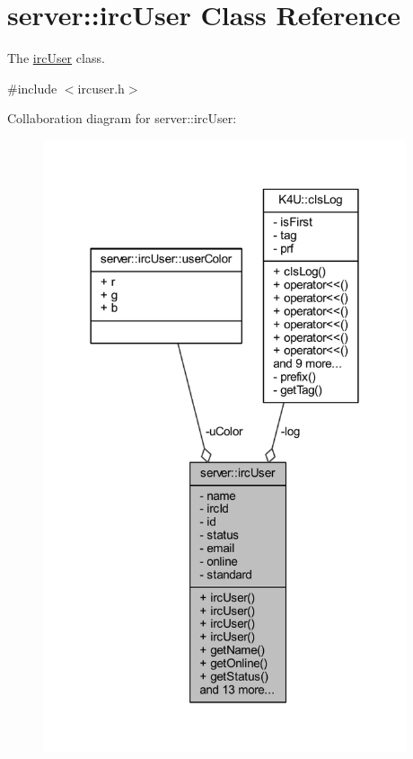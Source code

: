 \hypertarget{classserver_1_1irc_user}{\section{server\-:\-:irc\-User Class Reference}
\label{d2/d29/classserver_1_1irc_user}
}


The \hyperlink{classserver_1_1irc_user}{irc\-User} class.  




{\ttfamily \#include $<$ircuser.\-h$>$}



Collaboration diagram for server\-:\-:irc\-User\-:\nopagebreak
\begin{figure}[H]
\begin{center}
\leavevmode
\includegraphics[width=303pt]{dc/d58/classserver_1_1irc_user__coll__graph}
\end{center}
\end{figure}
